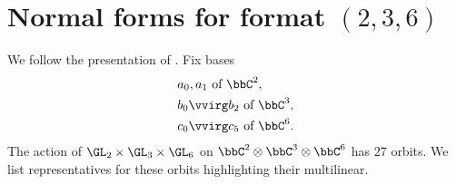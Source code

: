 \section{Normal forms for format $(2,3,6)$}
\label{RepTheory-orbitclassification-section-236}

We follow the presentation of \cite[Sec. 10.3]{Lan12}. Fix bases 
\begin{align*}
&a_0,a_1 \text { of } \bbC^2, \\
&b_0\vvirg b_2 \text{ of } \bbC^3, \\ 
&c_0\vvirg c_5 \text{ of } \bbC^6. \\ 
\end{align*}
The action of $\GL_2 \times \GL_3 \times \GL_6$ on $\bbC^2 \otimes \bbC^3 \otimes \bbC^6$ has $27$ orbits. We list representatives for these orbits highlighting their multilinear. 

